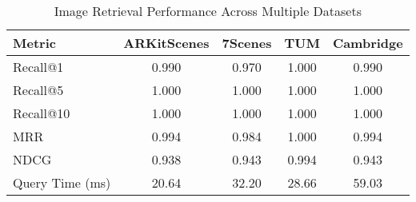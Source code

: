 \begin{table}[ht]
\centering
\caption{Image Retrieval Performance Across Multiple Datasets}
\label{table:retrieval_performance}
\begin{tabular}{lcccc}
\toprule
Metric & ARKitScenes & 7Scenes & TUM & Cambridge \\
\midrule
Recall@1 & 0.990 & 0.970 & 1.000 & 0.990 \\
Recall@5 & 1.000 & 1.000 & 1.000 & 1.000 \\
Recall@10 & 1.000 & 1.000 & 1.000 & 1.000 \\
MRR & 0.994 & 0.984 & 1.000 & 0.994 \\
NDCG & 0.938 & 0.943 & 0.994 & 0.943 \\
Query Time (ms) & 20.64 & 32.20 & 28.66 & 59.03 \\
\bottomrule
\end{tabular}
\end{table}
